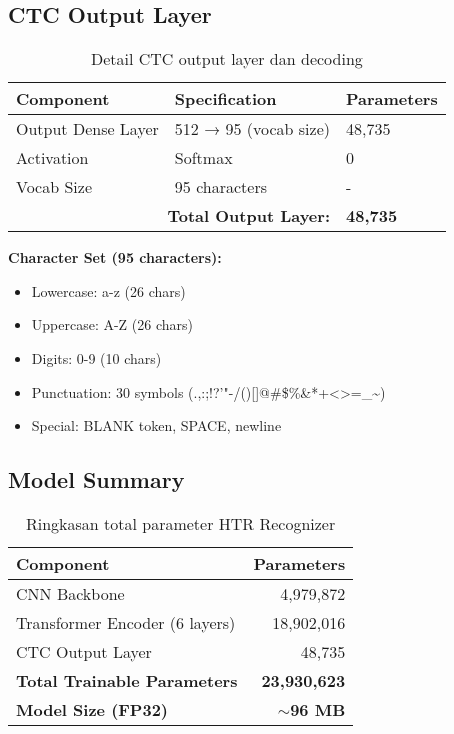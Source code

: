 \documentclass[12pt,a4paper]{article}
\begin{document}
\subsection{CTC Output Layer}

\begin{table}[H]
\centering
\caption{Detail CTC output layer dan decoding}
\label{tab:appendix-ctc-layer}
\small
\begin{tabular}{|l|l|l|}
\hline
\textbf{Component} & \textbf{Specification} & \textbf{Parameters} \\ \hline
Output Dense Layer & 512 → 95 (vocab size) & 48,735 \\ \hline
Activation & Softmax & 0 \\ \hline
Vocab Size & 95 characters & - \\ \hline
\multicolumn{2}{|r|}{\textbf{Total Output Layer:}} & \textbf{48,735} \\ \hline
\end{tabular}
\end{table}

\textbf{Character Set (95 characters):}
\begin{itemize}
    \item Lowercase: a-z (26 chars)
    \item Uppercase: A-Z (26 chars)
    \item Digits: 0-9 (10 chars)
    \item Punctuation: 30 symbols (.,:;!?'"-/()[]{}@\#\$\%\&*+<>=\_\textasciitilde)
    \item Special: BLANK token, SPACE, newline
\end{itemize}

\subsection{Model Summary}

\begin{table}[H]
\centering
\caption{Ringkasan total parameter HTR Recognizer}
\label{tab:appendix-model-summary}
\begin{tabular}{|l|r|}
\hline
\textbf{Component} & \textbf{Parameters} \\ \hline
CNN Backbone & 4,979,872 \\ \hline
Transformer Encoder (6 layers) & 18,902,016 \\ \hline
CTC Output Layer & 48,735 \\ \hline
\textbf{Total Trainable Parameters} & \textbf{23,930,623} \\ \hline
\textbf{Model Size (FP32)} & \textbf{$\sim$96 MB} \\ \hline
\end{tabular}
\end{table}
\end{document}
